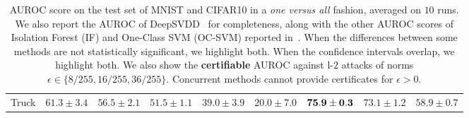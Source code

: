 \begin{table}
\begin{tabular}{c|ccccc|ccc}
    Truck & $61.3\pm 3.4$ & $56.5\pm 2.1$ & $51.5\pm 1.1$ & $39.0\pm 3.9$ & $20.0\pm 7.0$ & $\bf 75.9\pm 0.3$ & $73.1\pm 1.2$ & $58.9\pm 0.7$\\
    \end{tabular}
    \caption{AUROC score on the test set of MNIST and CIFAR10 in a \textit{one versus all} fashion, averaged on $10$ runs. We also report the AUROC of DeepSVDD~\cite{ruff2018deep} for completeness, along with the other AUROC scores of Isolation Forest (IF) and One-Class SVM (OC-SVM) reported in~\cite{ruff2018deep}. When the differences between some
    methods are not statistically significant, we highlight both.  When the confidence intervals overlap, we highlight both. We also show the \textbf{certifiable} AUROC against l-$2$ attacks of norms $\epsilon\in\{8/255,16/255,36/255\}$. Concurrent methods cannot provide certificates for $\epsilon>0$.}
    \label{tab:mnistroc}
\end{table}




